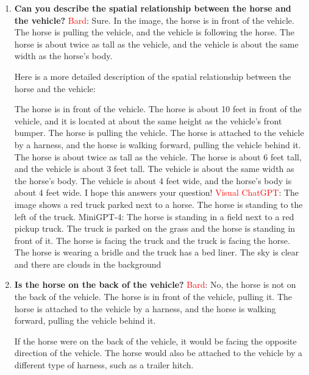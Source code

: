     \begin{enumerate}
        \item \textbf{Can you describe the spatial relationship between the horse and the vehicle?}
        \subitem \textcolor{Red}{Bard}:
        Sure. In the image, the horse is in front of the vehicle. The horse is pulling the vehicle, and the vehicle is following the horse. The horse is about twice as tall as the vehicle, and the vehicle is about the same width as the horse's body.

        Here is a more detailed description of the spatial relationship between the horse and the vehicle:

        The horse is in front of the vehicle. The horse is about 10 feet in front of the vehicle, and it is located at about the same height as the vehicle's front bumper.
        The horse is pulling the vehicle. The horse is attached to the vehicle by a harness, and the horse is walking forward, pulling the vehicle behind it.
        The horse is about twice as tall as the vehicle. The horse is about 6 feet tall, and the vehicle is about 3 feet tall.
        The vehicle is about the same width as the horse's body. The vehicle is about 4 feet wide, and the horse's body is about 4 feet wide.
        I hope this answers your question!
        \subitem \textcolor{red}{Visual ChatGPT}: The image shows a red truck parked next to a horse. The horse is standing to the left of the truck.
        \subitem MiniGPT-4: The horse is standing in a field next to a red pickup truck. The truck is parked on the grass and the horse is standing in front of it. The horse is facing the truck and the truck is facing the horse. The horse is wearing a bridle and the truck has a bed liner. The sky is clear and there are clouds in the background
        \item \textbf{Is the horse on the back of the vehicle?}
        \subitem \textcolor{Red}{Bard}: 
        No, the horse is not on the back of the vehicle. The horse is in front of the vehicle, pulling it. The horse is attached to the vehicle by a harness, and the horse is walking forward, pulling the vehicle behind it.
        
        If the horse were on the back of the vehicle, it would be facing the opposite direction of the vehicle. The horse would also be attached to the vehicle by a different type of harness, such as a trailer hitch.
        

\end{enumerate}
